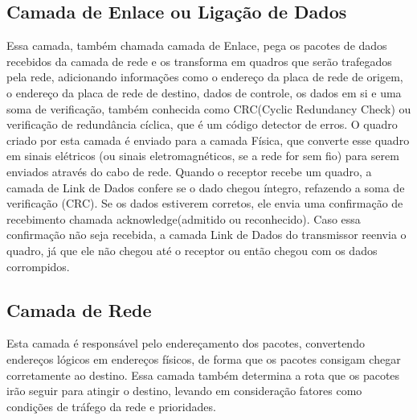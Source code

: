 
\subsection{Camada de Enlace ou Ligação de Dados}

Essa camada, também chamada camada de Enlace, pega os pacotes de dados recebidos da camada de rede e os transforma em quadros que serão trafegados pela rede, adicionando informações como o endereço da placa de rede de origem, o endereço da placa de rede de destino, dados de controle, os dados em si e uma soma de verificação, também conhecida como CRC(Cyclic Redundancy Check) ou verificação de redundância cíclica, que é um código detector de erros. O quadro criado por esta camada é enviado para a camada Física, que converte esse quadro em sinais elétricos (ou sinais eletromagnéticos, se a rede for sem fio) para serem enviados através do cabo de rede. Quando o receptor recebe um quadro, a camada de Link de Dados confere se o dado chegou íntegro, refazendo a soma de verificação (CRC). Se os dados estiverem corretos, ele envia uma confirmação de recebimento chamada acknowledge(admitido ou reconhecido). Caso essa confirmação não seja recebida, a camada Link de Dados do transmissor reenvia o quadro, já que ele não chegou até o receptor ou então chegou com os dados corrompidos.


\subsection{Camada de Rede}

Esta camada é responsável pelo endereçamento dos pacotes, convertendo endereços lógicos em endereços físicos, de forma que os pacotes consigam chegar corretamente ao destino. Essa camada também determina a rota que os pacotes irão seguir para atingir o destino, levando em consideração fatores como condições de tráfego da rede e prioridades.


